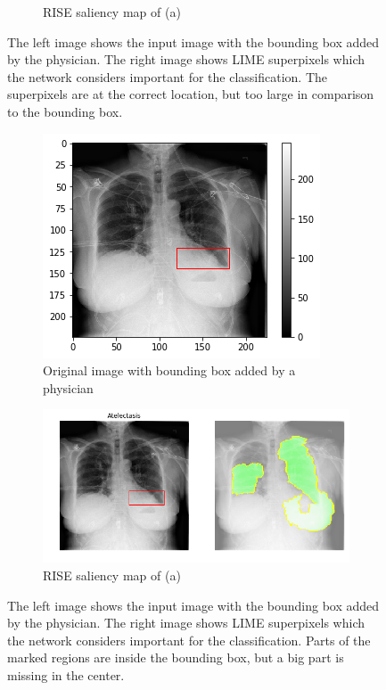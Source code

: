 \begin{figure}[H]
\begin{subfigure}[t]{.45\textwidth}
        \caption{RISE saliency map of (a)}
    \end{subfigure}
    \caption{The left image shows the input image with the bounding box added by the physician. The right image shows LIME superpixels which the network considers important for the classification. The superpixels are at the correct location, but too large in comparison to the bounding box.}
    \label{lime_example_1}
\end{figure}

\begin{figure}[H]
    \centering
    \begin{subfigure}[t]{.45\textwidth}
        \centering
        \includegraphics[width=\linewidth]{chapters/03_classification/images/rise1_bbox.png}
        \caption{Original image with bounding box added by a physician}
    \end{subfigure}\hspace{1cm}%
    \begin{subfigure}[t]{.45\textwidth}
        \centering
        \includegraphics[width=\linewidth]{chapters/03_classification/images/lime_2.png}
        \caption{RISE saliency map of (a)}
    \end{subfigure}
    \caption{The left image shows the input image with the bounding box added by the physician. The right image shows LIME superpixels which the network considers important for the classification. Parts of the marked regions are inside the bounding box, but a big part is missing in the center.}
    \label{lime_example_2}
\end{figure}

